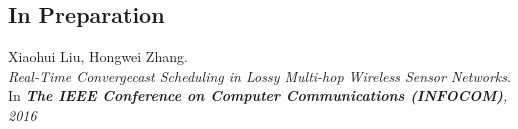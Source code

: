 \subsection{In Preparation}
\begin{thebibliography}{1}
Xiaohui Liu, Hongwei Zhang.
\\ \newblock \emph{Real-Time Convergecast Scheduling in Lossy Multi-hop Wireless Sensor Networks}.
\\ \newblock In \emph{\textbf{The IEEE Conference on Computer Communications (INFOCOM)}, 2016}
\end{thebibliography}
